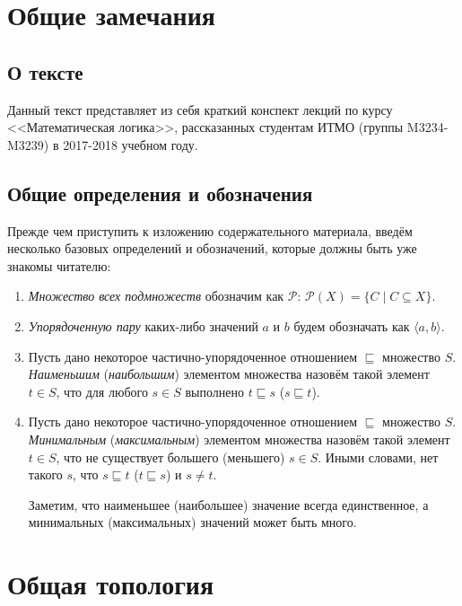 \section{Общие замечания}

\subsection{О тексте}

Данный текст представляет из себя краткий конспект лекций по курсу
<<Математическая логика>>, рассказанных студентам ИТМО (группы M3234-M3239)
в 2017-2018 учебном году.

\subsection{Общие определения и обозначения}

Прежде чем приступить к изложению содержательного материала, введём несколько
базовых определений и обозначений, которые должны быть уже знакомы читателю:

\begin{enumerate}
\item \emph{Множество всех подмножеств} обозначим как $\mathcal{P}$:
$\mathcal{P}(X) = \{ C \mid C \subseteq X \}$.

\item \emph{Упорядоченную пару} каких-либо значений $a$ и $b$ 
будем обозначать как $\langle a, b \rangle$.

\item Пусть дано некоторое частично-упорядоченное отношением $\sqsubseteq$ множество $S$.
\emph{Наименьшим} (\emph{наибольшим}) элементом множества назовём такой элемент $t \in S$, 
что для любого $s \in S$ выполнено $t \sqsubseteq s$ ($s \sqsubseteq t$).

\item Пусть дано некоторое частично-упорядоченное отношением $\sqsubseteq$ множество $S$.
\emph{Минимальным} (\emph{максимальным}) элементом множества назовём такой элемент $t \in S$, 
что не существует большего (меньшего) $s \in S$. Иными словами, нет такого $s$, что
$s \sqsubseteq t$ ($t \sqsubseteq s$) и $s \ne t$.

Заметим, что наименьшее (наибольшее) значение всегда единственное, а минимальных
(максимальных) значений может быть много.

\end{enumerate}

\section{Общая топология}

